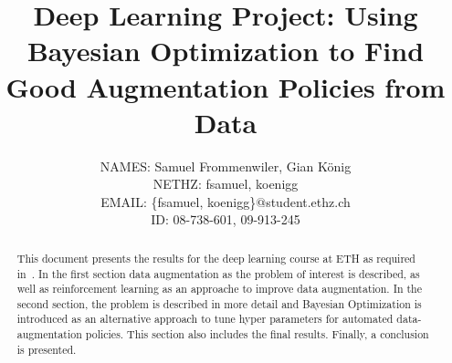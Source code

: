 \documentclass[10pt,twocolumn,letterpaper]{article}
\begin{document}
\title{Deep Learning Project: Using Bayesian Optimization to Find Good Augmentation Policies from Data}

\author{
    	\small{NAMES: Samuel Frommenwiler, Gian K\"onig} \\
   	\small{NETHZ: fsamuel, koenigg}\\
	\small{EMAIL: \{fsamuel, koenigg\}$@$student.ethz.ch}\\
    	\small{ID: 08-738-601, 09-913-245}
}

\maketitle

\begin{abstract}
This document presents the results for the deep learning course at ETH as required in~\cite{DL18}. In the first section data augmentation as the problem of interest is described, as well as reinforcement learning as an approache to improve data augmentation. In the second section, the problem is described in more detail and Bayesian Optimization is introduced as an alternative approach to tune hyper parameters for automated data-augmentation policies. This section also includes the final results. Finally, a conclusion is presented. 
\end{abstract}

\end{document}
